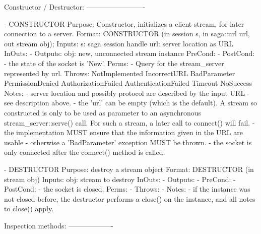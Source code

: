  \begin{myspec}
    Constructor / Destructor:
    -------------------------
 
    - CONSTRUCTOR
      Purpose:  Constructor, initializes a client stream,
                for later connection to a server.
      Format:   CONSTRUCTOR          (in  session    s,
                                      in  saga::url  url,
                                      out stream  obj);
      Inputs:   s:                    saga session handle
                url:                  server location as URL
      InOuts:   -
      Outputs:  obj:                  new, unconnected stream
                                      instance
      PreCond:  -
      PostCond: - the state of the socket is 'New'.
      Perms:    - Query for the stream_server represented by
                  url.
      Throws:   NotImplemented
                IncorrectURL
                BadParameter
                PermissionDenied
                AuthorizationFailed
                AuthenticationFailed
                Timeout
                NoSuccess
      Notes:    - server location and possibly protocol are
                  described by the input URL - see description
                  above.
                - the 'url' can be empty (which is the default).
                  A stream so constructed is only to be used
                  as parameter to an asynchronous
                  stream_server::serve() call.  For such a
                  stream, a later call to connect() will fail.  
                - the implementation MUST ensure that the
                  information given in the URL are usable -
                  otherwise a 'BadParameter' exception MUST be
                  thrown.
                - the socket is only connected after the
                  connect() method is called.
 
 
    - DESTRUCTOR
      Purpose:  destroy a stream object
      Format:   DESTRUCTOR           (in stream obj)
      Inputs:   obj:                  stream to destroy
      InOuts:   -
      Outputs:  -
      PreCond:  -
      PostCond: - the socket is closed.
      Perms:    -
      Throws:   -
      Notes:    - if the instance was not closed before, the 
                  destructor performs a close() on the instance,
                  and all notes to close() apply.
 
 
    Inspection methods:
    -------------------
 

\end{myspec}
